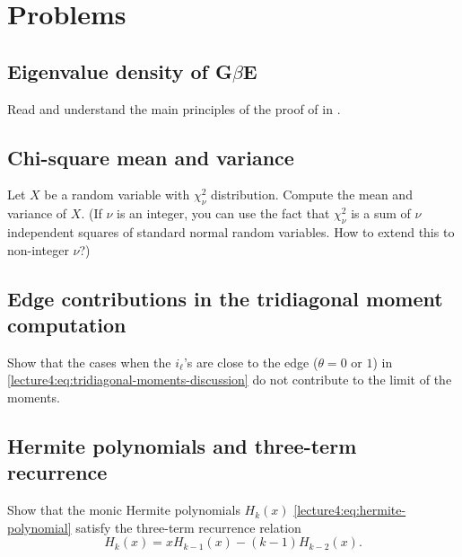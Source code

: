 \documentclass[letterpaper,11pt,oneside,reqno]{book}
\numberwithin{equation}{chapter}  %
\theoremstyle{definition}
\begin{document}
\section{Problems}

\subsection{Eigenvalue density of G\texorpdfstring{\(\beta\)}{beta}E}

Read and understand the main principles of the
proof of 
in \cite{dumitriu2002matrix}.

\subsection{Chi-square mean and variance}

Let $X$ be a random variable with $\chi^2_\nu$ distribution. Compute the mean and variance of $X$.
(If $\nu$ is an integer, you can use the fact that $\chi^2_\nu$ is a sum of $\nu$ independent squares of standard normal random variables.
How to extend this to non-integer \(\nu\)?)

\subsection{Edge contributions in the tridiagonal moment computation}
\label{lecture4:prob:edges-in-tridiagonal}

Show that the cases when the $i_{\ell}$'s are close to the edge ($\theta=0$ or $1$)
in \eqref{lecture4:eq:tridiagonal-moments-discussion}
do not contribute to the limit of the moments.

\subsection{Hermite polynomials and three-term recurrence}
\label{lecture4:prob:Hermite-3-term}

Show that the monic Hermite polynomials $H_k(x)$
\eqref{lecture4:eq:hermite-polynomial}
satisfy the three-term recurrence relation
\begin{equation*}
	\label{lecture4:eq:hermite-3-term}
	H_k(x) = x H_{k-1}(x) - (k-1) H_{k-2}(x).
\end{equation*}

\subsection{}
\label{lecture4:prob:Vandermonde-determinant}
\end{document}
